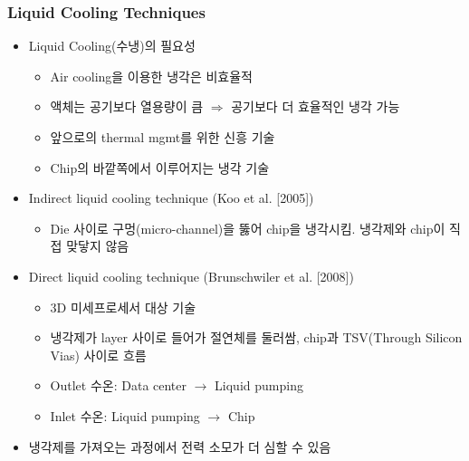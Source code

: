\subsubsection*{Liquid Cooling Techniques}
\begin{itemize}
    \item Liquid Cooling(수냉)의 필요성
    \begin{itemize}
        \item Air cooling을 이용한 냉각은 비효율적
        \item 액체는 공기보다 열용량이 큼 $\Rightarrow$ 공기보다 더 효율적인 냉각 가능
        \item 앞으로의 thermal mgmt를 위한 신흥 기술
        \item Chip의 바깥쪽에서 이루어지는 냉각 기술
    \end{itemize}
    \item Indirect liquid cooling technique (Koo et al. [2005])
    \begin{itemize}
        \item Die 사이로 구멍(micro-channel)을 뚫어 chip을 냉각시킴. 냉각제와 chip이 직접 맞닿지 않음
    \end{itemize}
    \item Direct liquid cooling technique (Brunschwiler et al. [2008])
    \begin{itemize}
        \item 3D 미세프로세서 대상 기술
        \item 냉각제가 layer 사이로 들어가 절연체를 둘러쌈, chip과 TSV(Through Silicon Vias) 사이로 흐름
        \item Outlet 수온: Data center $\rightarrow$ Liquid pumping
        \item Inlet 수온: Liquid pumping $\rightarrow$ Chip
    \end{itemize}
    \item 냉각제를 가져오는 과정에서 전력 소모가 더 심할 수 있음
\end{itemize}
